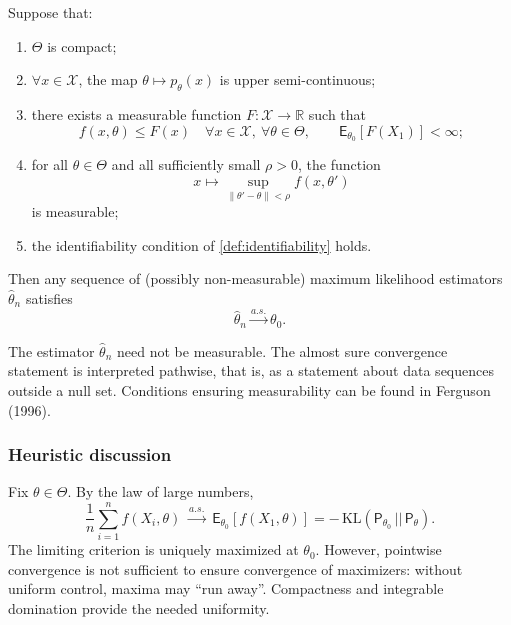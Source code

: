 \begin{theo}
\label{theo:wald}
Suppose that:
\begin{enumerate}[label=(\alph*)]
	\item $\Theta$ is compact;
	\item $\forall x\in\mathcal{X}$, the map $\theta\mapsto p_\theta(x)$ is upper semi-continuous;
	\item there exists a measurable function $F:\mathcal{X}\to\mathbb{R}$ such that
	\begin{equation*}
	f(x,\theta) \le F(x)
	\quad \forall x\in\mathcal{X},\ \forall \theta\in\Theta,
	\qquad
	\mathsf{E}_{\theta_0}[F(X_1)] < \infty;
	\end{equation*}
	\item for all $\theta\in\Theta$ and all sufficiently small $\rho>0$, the function
	\begin{equation*}
	x\mapsto \sup_{\|\theta'-\theta\|<\rho} f(x,\theta')
	\end{equation*}
	is measurable;
	\item the identifiability condition of \autoref{def:identifiability} holds.
\end{enumerate}
Then any sequence of (possibly non-measurable) maximum likelihood estimators $\hat{\theta}_n$ satisfies
\begin{equation*}
\hat{\theta}_n \xrightarrow{a.s.} \theta_0.
\end{equation*}
\end{theo}

\begin{remark}
The estimator $\hat{\theta}_n$ need not be measurable. The almost sure convergence statement is interpreted pathwise, that is, as a statement about data sequences outside a null set. Conditions ensuring measurability can be found in Ferguson (1996).
\end{remark}

\subsubsection{Heuristic discussion}

Fix $\theta\in\Theta$. By the law of large numbers,
\begin{equation*}
\frac{1}{n}\sum_{i=1}^n f(X_i,\theta)
\;\xrightarrow{a.s.}\;
\mathsf{E}_{\theta_0}[f(X_1,\theta)]
=
-\,\mathrm{KL}(\mathsf{P}_{\theta_0}\,||\,\mathsf{P}_{\theta}).
\end{equation*}
The limiting criterion is uniquely maximized at $\theta_0$. However, pointwise convergence is not sufficient to ensure convergence of maximizers: without uniform control, maxima may ``run away''. Compactness and integrable domination provide the needed uniformity.

